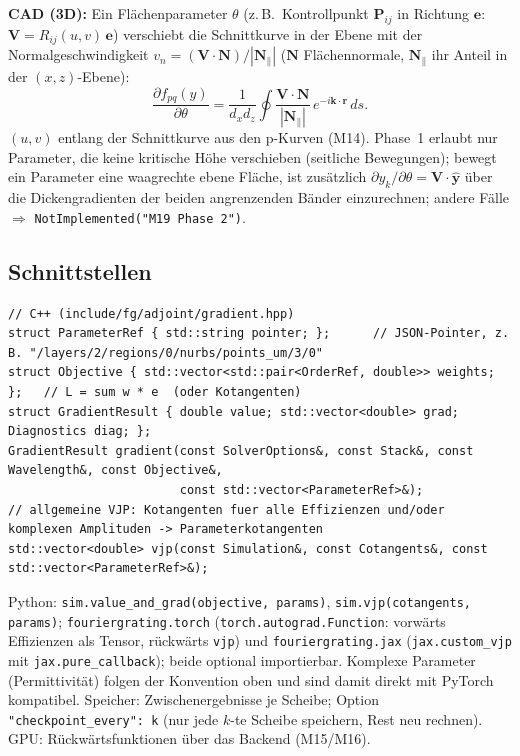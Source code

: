 \textbf{CAD (3D):} Ein Flächenparameter $\theta$ (z.\,B.\ Kontrollpunkt $\mathbf P_{ij}$ in Richtung $\mathbf e$:
$\mathbf V=R_{ij}(u,v)\,\mathbf e$) verschiebt die Schnittkurve in der Ebene mit der Normalgeschwindigkeit
$v_n=(\mathbf V\cdot\mathbf N)/|\mathbf N_\parallel|$ ($\mathbf N$ Flächennormale, $\mathbf N_\parallel$ ihr Anteil in der
$(x,z)$-Ebene):
\begin{equation}
  \frac{\partial f_{pq}(y)}{\partial\theta}=\frac{1}{d_xd_z}\oint\frac{\mathbf V\cdot\mathbf N}{|\mathbf N_\parallel|}\,
  e^{-i\mathbf k\cdot\mathbf r}\,ds .
  \label{eq:shape3d}
\end{equation}
$(u,v)$ entlang der Schnittkurve aus den p-Kurven (M14). Phase~1 erlaubt nur Parameter, die keine kritische Höhe
verschieben (seitliche Bewegungen); bewegt ein Parameter eine waagrechte ebene Fläche, ist zusätzlich
$\partial y_k/\partial\theta=\mathbf V\cdot\hat{\mathbf y}$ über die Dickengradienten der beiden angrenzenden Bänder
einzurechnen; andere Fälle $\Rightarrow$ \verb|NotImplemented("M19 Phase 2")|.

\subsection{Schnittstellen}
{\footnotesize\begin{verbatim}
// C++ (include/fg/adjoint/gradient.hpp)
struct ParameterRef { std::string pointer; };      // JSON-Pointer, z. B. "/layers/2/regions/0/nurbs/points_um/3/0"
struct Objective { std::vector<std::pair<OrderRef, double>> weights; };   // L = sum w * e  (oder Kotangenten)
struct GradientResult { double value; std::vector<double> grad; Diagnostics diag; };
GradientResult gradient(const SolverOptions&, const Stack&, const Wavelength&, const Objective&,
                        const std::vector<ParameterRef>&);
// allgemeine VJP: Kotangenten fuer alle Effizienzen und/oder komplexen Amplituden -> Parameterkotangenten
std::vector<double> vjp(const Simulation&, const Cotangents&, const std::vector<ParameterRef>&);
\end{verbatim}}
Python: \verb|sim.value_and_grad(objective, params)|, \verb|sim.vjp(cotangents, params)|;
\verb|fouriergrating.torch| (\verb|torch.autograd.Function|: vorwärts Effizienzen als Tensor, rückwärts \verb|vjp|) und
\verb|fouriergrating.jax| (\verb|jax.custom_vjp| mit \verb|jax.pure_callback|); beide optional importierbar.
Komplexe Parameter (Permittivität) folgen der Konvention oben und sind damit direkt mit PyTorch kompatibel.
Speicher: Zwischenergebnisse je Scheibe; Option \verb|"checkpoint_every": k| (nur jede $k$-te Scheibe speichern, Rest neu
rechnen). GPU: Rückwärtsfunktionen über das Backend (M15/M16).

